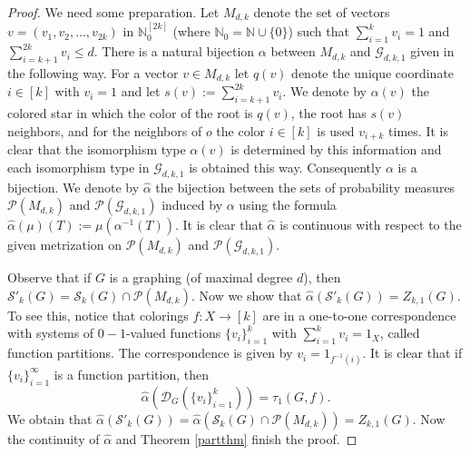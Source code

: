 \documentclass[a4wider]{amsart}
\theoremstyle{definitionbreak}\newtheorem{D}[theorem]{Definition}
\theoremstyle{definitionbreak}\newtheorem*{D*}{Definition}
\begin{document}
\begin{proof} We need some preparation. Let $M_{d,k}$ denote the set of vectors $v=(v_1,v_2,\dots,v_{2k})$ in $\mathbb{N}_0^{[2k]}$ (where $\mathbb{N}_0=\mathbb{N}\cup\{0\}$) such that $\sum_{i=1}^k v_i=1$ and $\sum_{i=k+1}^{2k}v_i\leq d$. There is a natural bijection $\alpha$ between $M_{d,k}$ and $\mathcal{G}_{d,k,1}$ given in the following way. For a vector $v\in M_{d,k}$ let $q(v)$ denote the unique coordinate $i\in [k]$ with $v_i=1$ and let $s(v):=\sum_{i=k+1}^{2k}v_i$.  We denote by $\alpha(v)$ the colored star in which the color of the  root is $q(v)$, the root has $s(v)$ neighbors, and for the neighbors of $o$ the color $i\in[k]$ is used $v_{i+k}$ times. It is clear that the isomorphism type $\alpha(v)$ is determined by this information and each isomorphism type in $\mathcal{G}_{d,k,1}$ is obtained this way. Consequently $\alpha$ is a bijection. We denote by $\hat{\alpha}$ the bijection between the sets of probability measures $\mathcal{P}(M_{d,k})$ and $\mathcal{P}(\mathcal{G}_{d,k,1})$ induced by $\alpha$ using the formula $\hat{\alpha}(\mu)(T):=\mu(\alpha^{-1}(T))$. It is clear that $\hat{\alpha}$ is continuous with respect to the given metrization on $\mathcal{P}(M_{d,k})$ and $\mathcal{P}(\mathcal{G}_{d,k,1})$.

Observe that if $G$ is a graphing (of maximal degree $d$), then $\mathcal{S}'_k(G)=\mathcal{S}_k(G)\cap \mathcal{P}(M_{d,k})$. Now we show that $\hat{\alpha}(\mathcal{S}'_k(G))=Z_{k,1}(G)$. To see this, notice that colorings $f:X\to [k]$ are in a one-to-one correspondence with systems of $0-1$-valued functions $\{v_i\}_{i=1}^k$ with $\sum_{i=1}^k v_i=1_X$, called function partitions. The correspondence is given by $v_i=1_{f^{-1}(i)}$. It is clear that if $\{v_i\}_{i=1}^\infty$ is a function partition, then $$\hat{\alpha}(\mathcal{D}_G(\{v_i\}_{i=1}^k))=\tau_1(G,f).$$ We obtain that $\hat{\alpha}(\mathcal{S}'_k(G))=\hat{\alpha}(\mathcal{S}_k(G)\cap\mathcal{P}(M_{d,k}))=Z_{k,1}(G).$  Now the continuity of $\hat{\alpha}$ and Theorem \ref{partthm} finish the proof.
\end{proof}



 



 



\end{document}
